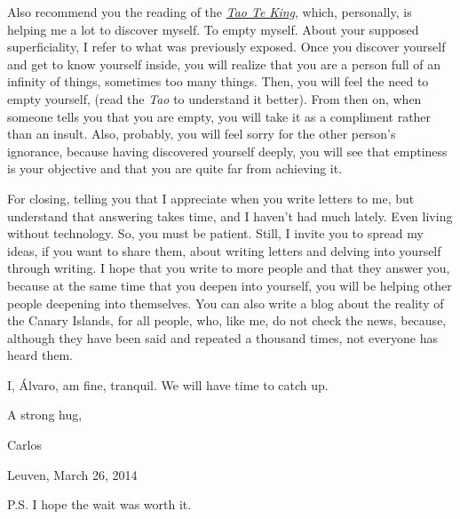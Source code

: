 \documentclass[]{book}
\begin{document}
Also recommend you the reading of the \href{https://en.wikipedia.org/wiki/Tao_Te_Ching}{\emph{Tao Te King}}, which, personally, is helping me a lot to discover myself. To empty myself. About your supposed superficiality, I refer to what was previously exposed. Once you discover yourself and get to know yourself inside, you will realize that you are a person full of an infinity of things, sometimes too many things. Then, you will feel the need to empty yourself, (read the \emph{Tao} to understand it better). From then on, when someone tells you that you are empty, you will take it as a compliment rather than an insult. Also, probably, you will feel sorry for the other person's ignorance, because having discovered yourself deeply, you will see that emptiness is your objective and that you are quite far from achieving it.

For closing, telling you that I appreciate when you write letters to me, but understand that answering takes time, and I haven't had much lately. Even living without technology. So, you must be patient. Still, I invite you to spread my ideas, if you want to share them, about writing letters and delving into yourself through writing. I hope that you write to more people and that they answer you, because at the same time that you deepen into yourself, you will be helping other people deepening into themselves. You can also write a blog about the reality of the Canary Islands, for all people, who, like me, do not check the news, because, although they have been said and repeated a thousand times, not everyone has heard them.

I, Álvaro, am fine, tranquil. We will have time to catch up.

A strong hug,

Carlos

Leuven, March 26, 2014

P.S. I hope the wait was worth it.


\end{document}
